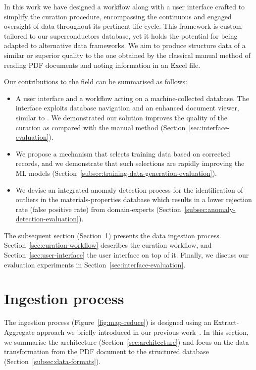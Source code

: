 \documentclass[a4paper]{article}
\begin{document}
In this work we have designed a workflow along with a user interface crafted to simplify the curation procedure, encompassing the continuous and engaged oversight of data throughout its pertinent life cycle. 
This framework is custom-tailored to our superconductors database, yet it holds the potential for being adapted to alternative data frameworks.
We aim to produce structure data of a similar or superior quality to the one obtained by the classical manual method of reading PDF documents and noting information in an Excel file.

Our contributions to the field can be summarised as follows:
\begin{itemize}
    \item A user interface and a workflow acting on a machine-collected database. The interface exploits database navigation and an enhanced document viewer, similar to \cite{wang2022hammer}. We demonstrated our solution improves the quality of the curation as compared with the manual method (Section~\ref{sec:interface-evaluation}).
    \item We propose a mechanism that selects training data based on corrected records, and we demonstrate that such selections are rapidly improving the ML models (Section~\ref{subsec:training-data-generation-evaluation}).
    \item We devise an integrated anomaly detection process for the identification of outliers in the materials-properties database which results in a lower rejection rate (false positive rate) from domain-experts (Section~\ref{subsec:anomaly-detection-evaluation}).
\end{itemize}

The subsequent section (Section~\ref{sec:ingestion}) presents the data ingestion process.
Section~\ref{sec:curation-workflow} describes the curation workflow, and Section~\ref{sec:user-interface} the user interface on top of it.
Finally, we discuss our evaluation experiments in Section~\ref{sec:interface-evaluation}. 


\section{Ingestion process}
\label{sec:ingestion}

The ingestion process (Figure~\ref{fig:map-reduce}) is designed using an Extract-Aggregate approach we briefly introduced in our previous work~\cite{lfoppiano2023automatic}. 
In this section, we summarise the architecture (Section~\ref{sec:architecture}) and focus on the data transformation from the PDF document to the structured database (Section~\ref{subsec:data-formats}).
\end{document}
